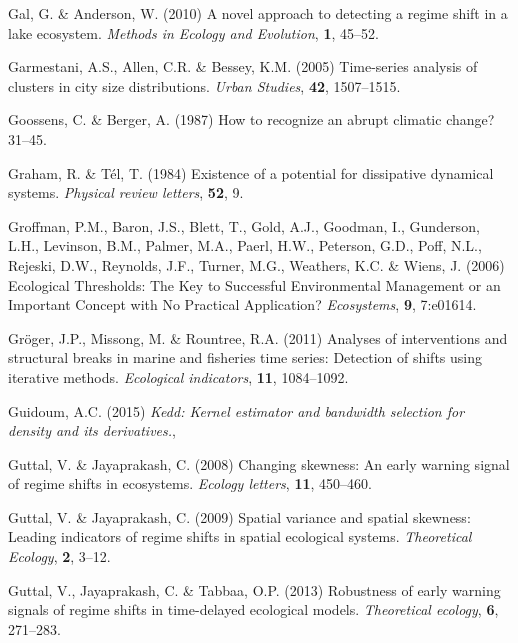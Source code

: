 \documentclass[12pt,twoside,openany]{reedthesis}
\begin{document}
\leavevmode\hypertarget{ref-gal2010novel}{}%
Gal, G. \& Anderson, W. (2010) A novel approach to detecting a regime shift in a lake ecosystem. \emph{Methods in Ecology and Evolution}, \textbf{1}, 45--52.

\leavevmode\hypertarget{ref-garmestani2005time}{}%
Garmestani, A.S., Allen, C.R. \& Bessey, K.M. (2005) Time-series analysis of clusters in city size distributions. \emph{Urban Studies}, \textbf{42}, 1507--1515.

\leavevmode\hypertarget{ref-goossens1987recognize}{}%
Goossens, C. \& Berger, A. (1987) How to recognize an abrupt climatic change? 31--45.

\leavevmode\hypertarget{ref-graham1984existence}{}%
Graham, R. \& Tél, T. (1984) Existence of a potential for dissipative dynamical systems. \emph{Physical review letters}, \textbf{52}, 9.

\leavevmode\hypertarget{ref-groffman_ecological_2006}{}%
Groffman, P.M., Baron, J.S., Blett, T., Gold, A.J., Goodman, I., Gunderson, L.H., Levinson, B.M., Palmer, M.A., Paerl, H.W., Peterson, G.D., Poff, N.L., Rejeski, D.W., Reynolds, J.F., Turner, M.G., Weathers, K.C. \& Wiens, J. (2006) Ecological Thresholds: The Key to Successful Environmental Management or an Important Concept with No Practical Application? \emph{Ecosystems}, \textbf{9}, 7:e01614.

\leavevmode\hypertarget{ref-groger2011analyses}{}%
Gröger, J.P., Missong, M. \& Rountree, R.A. (2011) Analyses of interventions and structural breaks in marine and fisheries time series: Detection of shifts using iterative methods. \emph{Ecological indicators}, \textbf{11}, 1084--1092.

\leavevmode\hypertarget{ref-kedd}{}%
Guidoum, A.C. (2015) \emph{Kedd: Kernel estimator and bandwidth selection for density and its derivatives.},

\leavevmode\hypertarget{ref-guttal2008changing}{}%
Guttal, V. \& Jayaprakash, C. (2008) Changing skewness: An early warning signal of regime shifts in ecosystems. \emph{Ecology letters}, \textbf{11}, 450--460.

\leavevmode\hypertarget{ref-guttal2009spatial}{}%
Guttal, V. \& Jayaprakash, C. (2009) Spatial variance and spatial skewness: Leading indicators of regime shifts in spatial ecological systems. \emph{Theoretical Ecology}, \textbf{2}, 3--12.

\leavevmode\hypertarget{ref-guttal2013robustness}{}%
Guttal, V., Jayaprakash, C. \& Tabbaa, O.P. (2013) Robustness of early warning signals of regime shifts in time-delayed ecological models. \emph{Theoretical ecology}, \textbf{6}, 271--283.
\end{document}
